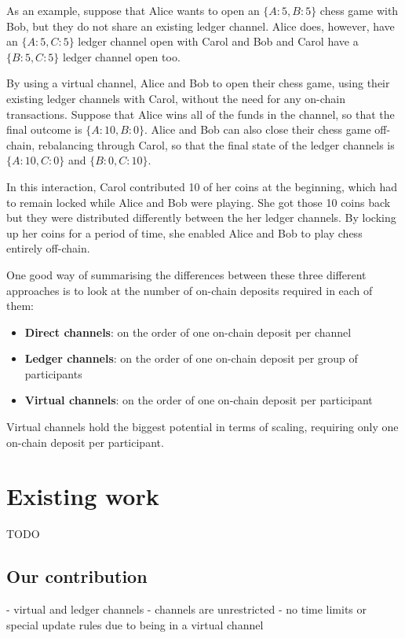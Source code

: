 \documentclass{article}
\begin{document}
As an example, suppose that Alice wants to open an $\{A:5, B:5\}$ chess game with Bob, but they do not share an existing ledger channel.
Alice does, however, have an $\{A:5, C:5\}$ ledger channel open with Carol and Bob and Carol have a $\{B:5, C:5\}$ ledger channel open too.

By using a virtual channel, Alice and Bob to open their chess game, using their existing ledger channels with Carol, without the need for any on-chain transactions.
Suppose that Alice wins all of the funds in the channel, so that the final outcome is $\{A: 10, B: 0\}$.
Alice and Bob can also close their chess game off-chain, rebalancing through Carol, so that the final state of the ledger channels is $\{A: 10, C: 0\}$ and $\{B: 0, C: 10\}$.

In this interaction, Carol contributed 10 of her coins at the beginning, which had to remain locked while Alice and Bob were playing.
She got those 10 coins back but they were distributed differently between the her ledger channels.
By locking up her coins for a period of time, she enabled Alice and Bob to play chess entirely off-chain.

One good way of summarising the differences between these three different approaches is to look at the number of on-chain deposits required in each of them:
\begin{itemize}
  \item \textbf{Direct channels}: on the order of one on-chain deposit per channel
  \item \textbf{Ledger channels}: on the order of one on-chain deposit per group of participants
  \item \textbf{Virtual channels}: on the order of one on-chain deposit per participant
\end{itemize}
Virtual channels hold the biggest potential in terms of scaling, requiring only one on-chain deposit per participant.

\section{Existing work}

TODO
\subsection{Our contribution}

- virtual and ledger channels
- channels are unrestricted
- no time limits or special update rules due to being in a virtual channel
\end{document}
